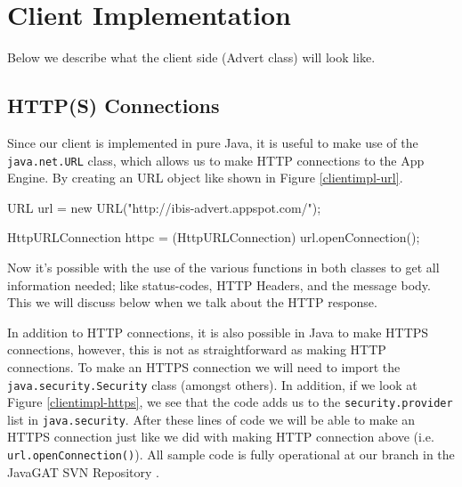 \section{Client Implementation}
Below we describe what the client side (Advert class) will look like.

\subsection{HTTP(S) Connections}
Since our client is implemented in pure Java, it is useful to make use of the
\texttt{java.net.URL} class, which allows us to make HTTP connections to the
App Engine. By creating an URL object like shown in Figure \ref{clientimpl-url}.

\begin{figure*}[ht] %
\begin{center}
\begin{code}
URL url = new URL("http://ibis-advert.appspot.com/");

HttpURLConnection httpc = (HttpURLConnection) url.openConnection();
\end{code}
\caption{Opening an HTTP Connection.\label{clientimpl-url}}
\end{center}
\end{figure*}

Now it's possible with the use of the various functions in both classes to get
all information needed; like status-codes, HTTP Headers, and the message body.
This we will discuss below when we talk about the HTTP response.

In addition to HTTP connections, it is also possible in Java to make HTTPS
connections, however, this is not as straightforward as making HTTP connections.
To make an HTTPS connection we will need to import the
\texttt{java.security.Security} class (amongst others). In addition, if we look
at Figure \ref{clientimpl-https}, we see that the code adds us to the
\texttt{security.provider} list in \texttt{java.security}. After these lines of
code we will be able to make an HTTPS connection just like we did with making
HTTP connection above (i.e. \texttt{url.openConnection()}). All sample code is
fully operational at our branch in the JavaGAT SVN Repository .

